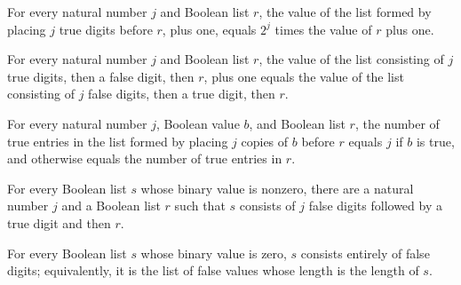 \begin{lemma}
\label{Complexity.TimeHierarchy.ctrVal_replicate_true}
\leanok
{}
For every natural number $j$ and Boolean list $r$, the value of the list formed by
placing $j$ true digits before $r$, plus one, equals $2^j$ times the value of $r$ plus
one.
\end{lemma}

\begin{lemma}
\label{Complexity.TimeHierarchy.ctrVal_borrow}
\leanok
{}
For every natural number $j$ and Boolean list $r$, the value of the list consisting of
$j$ true digits, then a false digit, then $r$, plus one equals the value of the list
consisting of $j$ false digits, then a true digit, then $r$.
\end{lemma}

\begin{lemma}
\label{Complexity.TimeHierarchy.ctrPop_replicate}
\leanok
{}
For every natural number $j$, Boolean value $b$, and Boolean list $r$, the number of
true entries in the list formed by placing $j$ copies of $b$ before $r$ equals $j$ if
$b$ is true, and otherwise equals the number of true entries in $r$.
\end{lemma}

\begin{lemma}
\label{Complexity.TimeHierarchy.ctrVal_pos_decomp}
\leanok
{}
For every Boolean list $s$ whose binary value is nonzero, there are a natural number $j$
and a Boolean list $r$ such that $s$ consists of $j$ false digits followed by a true
digit and then $r$.
\end{lemma}

\begin{lemma}
\label{Complexity.TimeHierarchy.ctrVal_zero_eq}
\leanok
{}
For every Boolean list $s$ whose binary value is zero, $s$ consists entirely of false
digits; equivalently, it is the list of false values whose length is the length of $s$.
\end{lemma}

